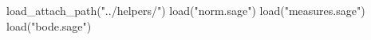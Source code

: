 \begin{sagesilent}
    load_attach_path("../helpers/")
    load("norm.sage")
    load("measures.sage")
    load("bode.sage")
\end{sagesilent}